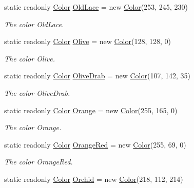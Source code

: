 \begin{DoxyCompactItemize}
static readonly \hyperlink{struct_tri_devs_1_1_tri_engine2_d_1_1_color}{Color} \hyperlink{struct_tri_devs_1_1_tri_engine2_d_1_1_color_a9ce008e65869f8b4f76504bc1e1bb0ab}{Old\-Lace} = new \hyperlink{struct_tri_devs_1_1_tri_engine2_d_1_1_color}{Color}(253, 245, 230)
\begin{DoxyCompactList}\small\item\em The color Old\-Lace. \end{DoxyCompactList}\item 
static readonly \hyperlink{struct_tri_devs_1_1_tri_engine2_d_1_1_color}{Color} \hyperlink{struct_tri_devs_1_1_tri_engine2_d_1_1_color_ae875f246fd344421d8fd127f31e3845c}{Olive} = new \hyperlink{struct_tri_devs_1_1_tri_engine2_d_1_1_color}{Color}(128, 128, 0)
\begin{DoxyCompactList}\small\item\em The color Olive. \end{DoxyCompactList}\item 
static readonly \hyperlink{struct_tri_devs_1_1_tri_engine2_d_1_1_color}{Color} \hyperlink{struct_tri_devs_1_1_tri_engine2_d_1_1_color_a95ee64af9429d0facfa6e0841ac3535d}{Olive\-Drab} = new \hyperlink{struct_tri_devs_1_1_tri_engine2_d_1_1_color}{Color}(107, 142, 35)
\begin{DoxyCompactList}\small\item\em The color Olive\-Drab. \end{DoxyCompactList}\item 
static readonly \hyperlink{struct_tri_devs_1_1_tri_engine2_d_1_1_color}{Color} \hyperlink{struct_tri_devs_1_1_tri_engine2_d_1_1_color_aeca74430b3f58767f0a7e913b28490f7}{Orange} = new \hyperlink{struct_tri_devs_1_1_tri_engine2_d_1_1_color}{Color}(255, 165, 0)
\begin{DoxyCompactList}\small\item\em The color Orange. \end{DoxyCompactList}\item 
static readonly \hyperlink{struct_tri_devs_1_1_tri_engine2_d_1_1_color}{Color} \hyperlink{struct_tri_devs_1_1_tri_engine2_d_1_1_color_a2c6f856bd67091bd076e6689a7b32abe}{Orange\-Red} = new \hyperlink{struct_tri_devs_1_1_tri_engine2_d_1_1_color}{Color}(255, 69, 0)
\begin{DoxyCompactList}\small\item\em The color Orange\-Red. \end{DoxyCompactList}\item 
static readonly \hyperlink{struct_tri_devs_1_1_tri_engine2_d_1_1_color}{Color} \hyperlink{struct_tri_devs_1_1_tri_engine2_d_1_1_color_a166720b2a3d055d6164d7729431297aa}{Orchid} = new \hyperlink{struct_tri_devs_1_1_tri_engine2_d_1_1_color}{Color}(218, 112, 214)

\end{DoxyCompactItemize}
